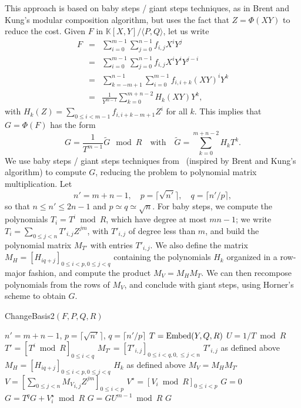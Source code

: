 \documentclass[12pt]{article}
\def\K {\ensuremath{\mathbb{K}}}
\begin{document}
This approach is based on baby steps / giant steps techniques, as in
Brent and Kung's modular composition algorithm, but uses the fact that
$Z=\Phi(XY)$ to reduce the cost. Given $F$ in $\K[X,Y]/\langle
P,Q\rangle$, let us write
\begin{eqnarray*}
F&=&\sum_{i=0}^{m-1}\sum_{j=0}^{n-1} f_{i,j}X^i Y^j\\
&=&\sum_{i=0}^{m-1}\sum_{j=0}^{n-1} f_{i,j}X^i Y^i Y^{j-i}\\
&=&\sum_{k=-m+1}^{n-1}\sum_{i=0}^{m-1} f_{i,i+k}(XY)^i Y^k\\
&=&\frac{1}{Y^{m-1}} \sum_{k=0}^{m+n-2} H_k(XY) Y^k,
\end{eqnarray*}
with $H_k(Z)=\sum_{0 \le i < m-1} f_{i,i+k-m+1} Z^i$ for all $k$.
This implies that $G=\Phi(F)$ has the form
$$G = \frac{1}{T^{m-1}}\widetilde{G} \mod R\quad\text{with}\quad
\widetilde{G}=\sum_{k=0}^{m+n-2} H_k T^k.$$ We use baby steps / giant
steps techniques from~\cite{LeMeSc13} (inspired by Brent and Kung's
algorithm) to compute $G$, reducing the problem to polynomial matrix
multiplication. Let
$$n'=m+n-1,\quad p=\lceil \sqrt {n'} \rceil,\quad q=\lceil
n'/p\rceil,$$ so that $n \le n' \le 2n-1$ and $p\simeq q \simeq
\sqrt{n}$.  For baby steps, we compute the polynomials $T_i=T^i \bmod
R$, which have degree at most $mn-1$; we write $T_i = \sum_{0 \le j <
  n} T'_{i,j} Z^{jm}$, with $T'_{i,j}$ of degree less than $m$, and
build the polynomial matrix $M_{T'}$ with entries $T'_{i,j}$.  We also
define the matrix $M_H=[H_{iq+j}]_{0 \le i <p, 0 \le j < q}$
containing the polynomials $H_k$ organized in a row-major fashion, and
compute the product $M_V=M_H M_T$. We can then recompose polynomials
from the rows of $M_V$, and conclude with giant steps, using Horner's
scheme to obtain $G$.
\begin{algorithm}[H]
  \caption{ChangeBasis2$(F,P,Q,R)$}
  \begin{algorithmic}[1]
    \STATE $n'=m+n-1$, $p=\lceil \sqrt {n'} \rceil$, $q=\lceil n'/p\rceil$
    \STATE\label{iso2:2} $T={\rm Embed}(Y,Q,R)$
    \STATE\label{iso2:3} $U=1/T \bmod R$
    \STATE\label{iso2:4} $T'=[T^i \bmod R]_{0 \le i < q}$
    \STATE $M_{T'}=[T'_{i,j}]_{0\le i < q, 0, \le j < n}$ \hfill $T'_{i,j}$ as defined above
    \STATE $M_H=[H_{iq+j}]_{0 \le i <p, 0 \le j < q}$ \hfill $H_k$ as defined above
    \STATE\label{iso2:7} $M_V = M_H M_{T'}$
    \STATE $V=[\sum_{0 \le j <n} {M_V}_{i,j} Z^{jm} ]_{0 \le i <p}$
    \STATE $V^\star=[V_i \bmod R]_{0 \le i <p}$
    \STATE $G=0$
    \label{iso2:11}
    \STATE $G=T^qG+V^\star_i \bmod R$
    \ENDFOR
    \STATE\label{iso2:14} $G=G U^{m-1} \bmod R$
    \RETURN $G$
  \end{algorithmic}
  \label{algo:iso2}
\end{algorithm}
\end{document}
